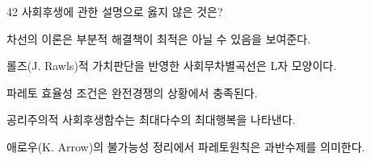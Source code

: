 \begin{question}{42}
사회후생에 관한 설명으로 옳지 않은 것은?
\begin{choices}
  \item 차선의 이론은 부분적 해결책이 최적은 아닐 수 있음을 보여준다.
  \item 롤즈(J. Rawls)적 가치판단을 반영한 사회무차별곡선은 L자 모양이다.
  \item 파레토 효율성 조건은 완전경쟁의 상황에서 충족된다.
  \item 공리주의적 사회후생함수는 최대다수의 최대행복을 나타낸다.
  \item 애로우(K. Arrow)의 불가능성 정리에서 파레토원칙은 과반수제를 의미한다.
\end{choices}
\end{question}
